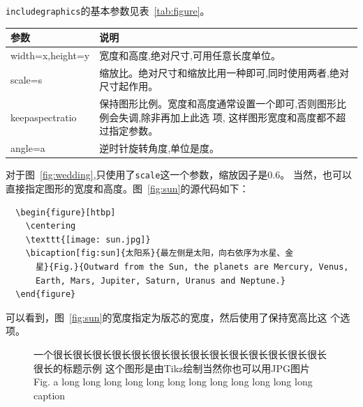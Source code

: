 \texttt{includegraphics}的基本参数见表~\ref{tab:figure}。

\begin{table}[htbp]
  \centering
  \vspace{0.2cm}
  \wuhao
  \begin{tabularx}{0.8\textwidth{}}{lX}
    \toprule
    参数             & 说明                                                             \\
    \midrule
    width=x,height=y & 宽度和高度,绝对尺寸,可用任意长度单位。                           \\
    scale=s          & 缩放比。绝对尺寸和缩放比用一种即可,同时使用两者,绝对尺寸起作用。 \\
    keepaspectratio  & 保持图形比例。宽度和高度通常设置一个即可,否则图形比
    例会失调,除非再加上此选 项,
    这样图形宽度和高度都不超过指定参数。                                                \\
    angle=a          & 逆时针旋转角度,单位是度。                                        \\
    \bottomrule
  \end{tabularx}
\end{table}

对于图~\ref{fig:wedding},只使用了\texttt{scale}这一个参数，缩放因子是0.6。
当然，也可以直接指定图形的宽度和高度。图~\ref{fig:sun}的源代码如下：

\begin{lstlisting}
  \begin{figure}[htbp]
    \centering
    \texttt{[image: sun.jpg]}
    \bicaption[fig:sun]{太阳系}{最左侧是太阳，向右依序为水星、金
      星}{Fig.}{Outward from the Sun, the planets are Mercury, Venus,
      Earth, Mars, Jupiter, Saturn, Uranus and Neptune.}
  \end{figure}
\end{lstlisting}

可以看到，图~\ref{fig:sun}的宽度指定为版芯的宽度，然后使用了保持宽高比这
个选项。

\begin{figure}[tbph]
  \usetikzlibrary{calc,through}
  \centering

  {一个很长很长很长很长很长很长很长很长很长很长很长很长很长很长很长的标题示例
    这个图形是由Tikz绘制当然你也可以用JPG图片}
  {Fig.}
  {a long long long long long long long long long long long long caption}
\end{figure}

